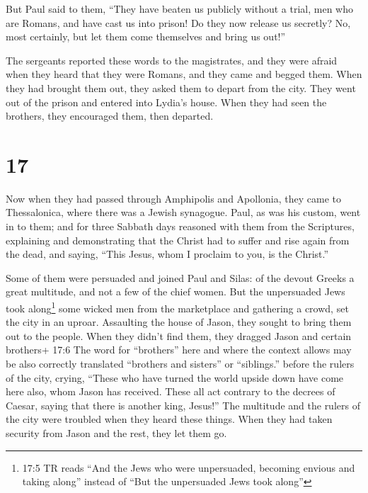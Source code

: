  But Paul said to them, ``They have beaten us publicly
without a trial, men who are Romans, and have cast us into prison! Do
they now release us secretly? No, most certainly, but let them come
themselves and bring us out!''

 The sergeants reported these words to the magistrates, and
they were afraid when they heard that they were Romans, 
and they came and begged them. When they had brought them out, they
asked them to depart from the city.  They went out of the
prison and entered into Lydia's house. When they had seen the brothers,
they encouraged them, then departed.

\hypertarget{section-16}{%
\section{17}\label{section-16}}

 Now when they had passed through Amphipolis and Apollonia,
they came to Thessalonica, where there was a Jewish synagogue.
 Paul, as was his custom, went in to them; and for three
Sabbath days reasoned with them from the Scriptures, 
explaining and demonstrating that the Christ had to suffer and rise
again from the dead, and saying, ``This Jesus, whom I proclaim to you,
is the Christ.''

 Some of them were persuaded and joined Paul and Silas: of
the devout Greeks a great multitude, and not a few of the chief women.
 But the unpersuaded Jews took along\footnote{17:5 TR reads
  ``And the Jews who were unpersuaded, becoming envious and taking
  along'' instead of ``But the unpersuaded Jews took along''} some
wicked men from the marketplace and gathering a crowd, set the city in
an uproar. Assaulting the house of Jason, they sought to bring them out
to the people.  When they didn't find them, they dragged
Jason and certain brothers+ 17:6 The word for ``brothers'' here and
where the context allows may be also correctly translated ``brothers and
sisters'' or ``siblings.'' before the rulers of the city, crying,
``These who have turned the world upside down have come here also,
 whom Jason has received. These all act contrary to the
decrees of Caesar, saying that there is another king, Jesus!''
 The multitude and the rulers of the city were troubled when
they heard these things.  When they had taken security from
Jason and the rest, they let them go.

